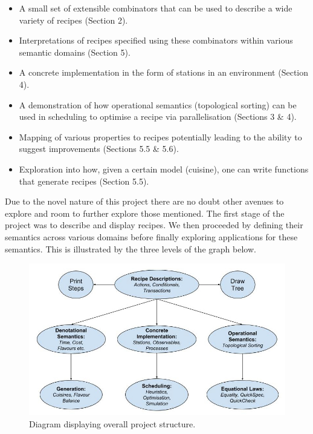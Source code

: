 \documentclass[11pt]{article}
\begin{document}
\begin{itemize}
    \item A small set of extensible combinators that can be used to describe a wide variety of recipes (Section 2).

    \item Interpretations of recipes specified using these combinators within various semantic domains (Section 5).

    \item A concrete implementation in the form of stations in an environment (Section 4).

    \item A demonstration of how operational semantics (topological sorting) can be used in
    scheduling to optimise a recipe via parallelisation (Sections 3 \& 4).

    \item Mapping of various properties to recipes potentially leading to the ability
    to suggest improvements (Sections 5.5 \& 5.6).

    \item Exploration into how, given a certain model (cuisine), one can write functions that
    generate recipes (Section 5.5).
\end{itemize}

Due to the novel nature of this project there are no doubt other avenues to explore and
room to further explore those mentioned. The first stage of the project was to describe
and display recipes. We then proceeded by defining their semantics across various domains
before finally exploring applications for these semantics. This is illustrated by the
three levels of the graph below.

\begin{figure}[h]
\includegraphics[width=\textwidth, keepaspectratio]{project.jpg}
\centering
\caption{Diagram displaying overall project structure.}
\end{figure}
\end{document}

